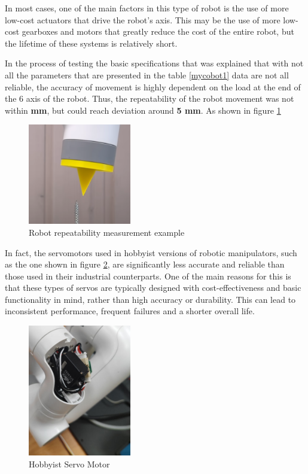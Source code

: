  


 In most cases, one of the main factors in this type of robot is the use of more low-cost actuators that drive the robot's axis. This may be the use of more low-cost gearboxes and motors that greatly reduce the cost of the entire robot, but the lifetime of these systems is relatively short.

 In the process of testing the basic specifications that was explained that with not all the parameters that are presented in the table \ref*{mycobot1} data are not all reliable, the accuracy of movement is highly dependent on the load at the end of the 6 axis of the robot. Thus, the repeatability of the robot movement was not within \textbf{ mm}, but could reach deviation around \textbf{ 5 mm}. As shown in figure \ref*{mycobot2} 

 \begin{figure}[H]
	\centering
	\includegraphics[width=0.4\textwidth]{Src/images/mycobot2.png}
	\caption{Robot repeatability measurement example}
    \label{mycobot2}
\end{figure}

In fact, the servomotors used in hobbyist versions of robotic manipulators, such as the one shown in figure \ref*{mycobot3}, are significantly less accurate and reliable than those used in their industrial counterparts. One of the main reasons for this is that these types of servos are typically designed with cost-effectiveness and basic functionality in mind, rather than high accuracy or durability. This can lead to inconsistent performance, frequent failures and a shorter overall life.


\begin{figure}[H]
	\centering
	\includegraphics[width=0.4\textwidth]{Src/images/mycobot3.png}
	\caption{Hobbyist Servo Motor}
    \label{mycobot3}
\end{figure}


